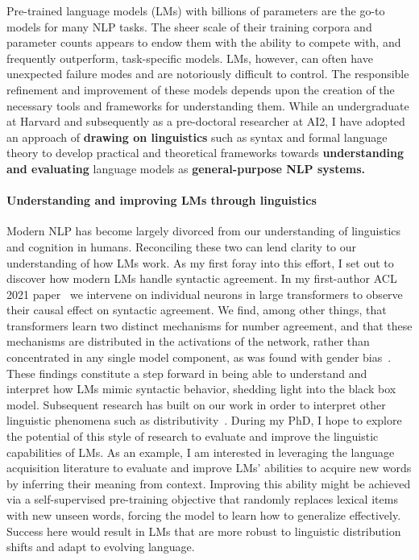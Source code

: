 \documentclass[11pt]{article}
\begin{document}
Pre-trained language models (LMs) with billions of parameters 
are the go-to models for many NLP tasks.
The sheer scale of their training corpora and parameter counts
appears to endow them with the ability to compete with, 
and frequently outperform, task-specific models.
LMs, however, can often have unexpected failure modes 
and are notoriously difficult to control.
The responsible refinement and improvement of these models
depends upon the creation of the necessary tools 
and frameworks for understanding them.
While an undergraduate at Harvard and subsequently as a pre-doctoral researcher 
at AI2, I have adopted an approach of 
\textbf{drawing on linguistics} such as syntax and formal language theory 
to develop practical and theoretical frameworks  
towards \textbf{understanding and evaluating} language models 
as \textbf{general-purpose NLP systems.}

\paragraph{Understanding and improving LMs through linguistics}

Modern NLP has become largely divorced 
from our understanding of linguistics and cognition in humans.
Reconciling these two can lend clarity to our understanding of how LMs work.
As my first foray into this effort, I set out to 
discover how modern LMs handle syntactic agreement.
In my first-author ACL 2021 paper~\cite{finlayson-etal-2021-causal}
we intervene on individual neurons in large transformers 
to observe their causal effect on syntactic agreement.
We find, among other things, that transformers learn 
two distinct mechanisms for number agreement,
and that these mechanisms are distributed in the activations of the network, 
rather than concentrated in any single model component,
as was found with gender bias~\cite{Vig2020InvestigatingGB}.
These findings constitute a step forward in being able to understand and interpret
how LMs mimic syntactic behavior, shedding light into the black box model.
Subsequent research has built on our work 
in order to interpret other linguistic phenomena 
such as distributivity~\cite{Ban2022TestingPL}.
During my PhD, I hope to explore the potential of this style of research
to evaluate and improve the linguistic capabilities of LMs. 
As an example, I am interested in leveraging the language acquisition literature
to evaluate and improve LMs' abilities 
to acquire new words by inferring their meaning from context.
Improving this ability might be achieved via a self-supervised pre-training objective 
that randomly replaces lexical items with new unseen words, 
forcing the model to learn how to generalize effectively.
Success here would result in LMs that are 
more robust to linguistic distribution shifts
and adapt to evolving language.
\end{document}
